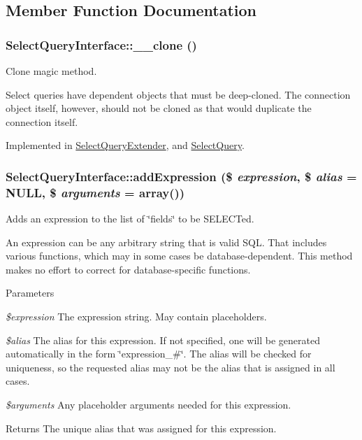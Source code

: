 \subsection{Member Function Documentation}
\hypertarget{interfaceSelectQueryInterface_a5ed9c2932a32b2649a252e5594e1df83}{
\subsubsection[{\_\-\_\-clone}]{\setlength{\rightskip}{0pt plus 5cm}SelectQueryInterface::\_\-\_\-clone ()}}
\label{interfaceSelectQueryInterface_a5ed9c2932a32b2649a252e5594e1df83}
Clone magic method.

Select queries have dependent objects that must be deep-\/cloned. The connection object itself, however, should not be cloned as that would duplicate the connection itself. 

Implemented in \hyperlink{classSelectQueryExtender_a3d9ade6266951fdc8e5757c8e61b352c}{SelectQueryExtender}, and \hyperlink{classSelectQuery_a4a73a8d52451d193b53192e478a88161}{SelectQuery}.\hypertarget{interfaceSelectQueryInterface_a85b30bde2daad80cb614d7d1f5b8dae3}{
\subsubsection[{addExpression}]{\setlength{\rightskip}{0pt plus 5cm}SelectQueryInterface::addExpression (\$ {\em expression}, \/  \$ {\em alias} = {\ttfamily NULL}, \/  \$ {\em arguments} = {\ttfamily array()})}}
\label{interfaceSelectQueryInterface_a85b30bde2daad80cb614d7d1f5b8dae3}
Adds an expression to the list of \char`\"{}fields\char`\"{} to be SELECTed.

An expression can be any arbitrary string that is valid SQL. That includes various functions, which may in some cases be database-\/dependent. This method makes no effort to correct for database-\/specific functions.


\begin{DoxyParams}{Parameters}
\item[{\em \$expression}]The expression string. May contain placeholders. \item[{\em \$alias}]The alias for this expression. If not specified, one will be generated automatically in the form \char`\"{}expression\_\-\#\char`\"{}. The alias will be checked for uniqueness, so the requested alias may not be the alias that is assigned in all cases. \item[{\em \$arguments}]Any placeholder arguments needed for this expression. \end{DoxyParams}
\begin{DoxyReturn}{Returns}
The unique alias that was assigned for this expression. 
\end{DoxyReturn}


